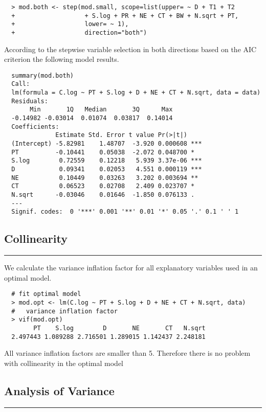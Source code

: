 \begingroup
  \scriptsize
  \begin{verbatim}
  > mod.both <- step(mod.small, scope=list(upper= ~ D + T1 + T2
  +                   + S.log + PR + NE + CT + BW + N.sqrt + PT,
  +                   lower= ~ 1),
  +                   direction="both")

  \end{verbatim}
\endgroup
According to the stepwise variable selection in both directions based on the AIC criterion the following model results.\\

\begingroup
  \scriptsize
  \begin{verbatim}
  summary(mod.both)
  Call:
  lm(formula = C.log ~ PT + S.log + D + NE + CT + N.sqrt, data = data)
  Residuals:
       Min       1Q   Median       3Q      Max
  -0.14982 -0.03014  0.01074  0.03817  0.14014
  Coefficients:
              Estimate Std. Error t value Pr(>|t|)
  (Intercept) -5.82981    1.48707  -3.920 0.000608 ***
  PT          -0.10441    0.05038  -2.072 0.048700 *
  S.log        0.72559    0.12218   5.939 3.37e-06 ***
  D            0.09341    0.02053   4.551 0.000119 ***
  NE           0.10449    0.03263   3.202 0.003694 **
  CT           0.06523    0.02708   2.409 0.023707 *
  N.sqrt      -0.03046    0.01646  -1.850 0.076133 .
  ---
  Signif. codes:  0 '***' 0.001 '**' 0.01 '*' 0.05 '.' 0.1 ' ' 1

\end{verbatim}
\endgroup


\subsection{Collinearity}
\noindent\rule[\linienAbstand]{\linewidth}{\linienDicke}
We calculate the variance inflation factor for all explanatory variables used in an optimal model.\\

\begingroup
  \scriptsize
  \begin{verbatim}
  # fit optimal model
  > mod.opt <- lm(C.log ~ PT + S.log + D + NE + CT + N.sqrt, data)
  #   variance inflation factor
  > vif(mod.opt)
        PT    S.log        D       NE       CT   N.sqrt
  2.497443 1.089288 2.716501 1.289015 1.142437 2.248181
  \end{verbatim}
\endgroup
All variance inflation factors are smaller than 5. Therefore there is no problem with collinearity in the optimal model\\

\subsection{Analysis of Variance}
\noindent\rule[\linienAbstand]{\linewidth}{\linienDicke}
\begingroup
  \scriptsize
  \begin{verbatim}

  \end{verbatim}
\endgroup


